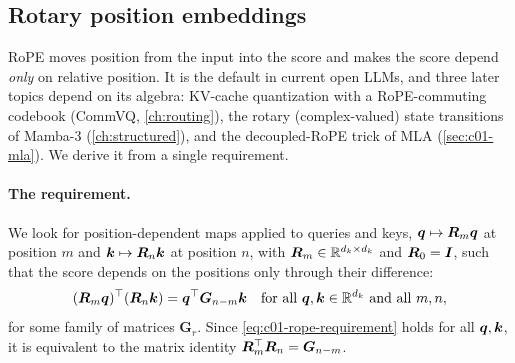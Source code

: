 \subsection{Rotary position embeddings}\label{sec:c01-rope}

RoPE \citep{c01-su2024roformer} moves position from the input into the score and makes the
score depend \emph{only} on relative position. It is the default in current open LLMs, and
three later topics depend on its algebra: KV-cache quantization with a RoPE-commuting
codebook (CommVQ, \cref{ch:routing}), the rotary (complex-valued) state transitions of
Mamba-3 (\cref{ch:structured}), and the decoupled-RoPE trick of MLA
(\cref{sec:c01-mla}). We derive it from a single requirement.

\paragraph{The requirement.} We look for position-dependent maps applied to queries and keys,
$\bm{q} \mapsto \bm{R}_m\bm{q}$ at position $m$ and $\bm{k} \mapsto \bm{R}_n\bm{k}$ at position $n$, with
$\bm{R}_m \in \mathbb{R}^{d_k\times d_k}$ and $\bm{R}_0 = \bm{I}$, such that the score depends on the
positions only through their difference:
\begin{equation}\label{eq:c01-rope-requirement}
  (\bm{R}_m\bm{q})^{\top}(\bm{R}_n\bm{k}) = \bm{q}^{\top}\bm{G}_{n-m}\bm{k}
  \quad\text{for all } \bm{q}, \bm{k} \in \mathbb{R}^{d_k} \text{ and all } m, n,
\end{equation}
for some family of matrices $\bm{G}_r$. Since \eqref{eq:c01-rope-requirement} holds for all
$\bm{q}, \bm{k}$, it is equivalent to the matrix identity $\bm{R}_m^{\top}\bm{R}_n = \bm{G}_{n-m}$.

